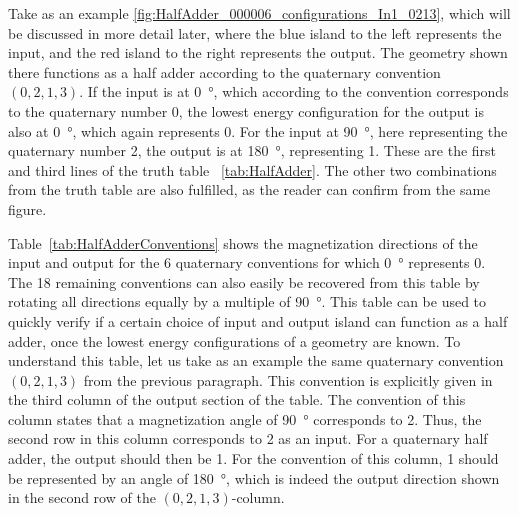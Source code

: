\documentclass[11pt,a4paper,english]{article}
\begin{document}
Take as an example \cref{fig:HalfAdder_000006_configurations_In1_0213}, which will be discussed in more detail later, where the blue island to the left represents the input, and the red island to the right represents the output. The geometry shown there functions as a half adder according to the quaternary convention $(0, 2, 1, 3)$. If the input is at \SI{0}{\degree}, which according to the convention corresponds to the quaternary number 0, the lowest energy configuration for the output is also at \SI{0}{\degree}, which again represents 0. For the input at \SI{90}{\degree}, here representing the quaternary number 2, the output is at \SI{180}{\degree}, representing 1. These are the first and third lines of the truth table~ \ref{tab:HalfAdder}. The other two combinations from the truth table are also fulfilled, as the reader can confirm from the same figure. \par
Table~\ref{tab:HalfAdderConventions} shows the magnetization directions of the input and output for the 6 quaternary conventions for which \SI{0}{\degree} represents 0. The 18 remaining conventions can also easily be recovered from this table by rotating all directions equally by a multiple of \SI{90}{\degree}. This table can be used to quickly verify if a certain choice of input and output island can function as a half adder, once the lowest energy configurations of a geometry are known. To understand this table, let us take as an example the same quaternary convention $(0, 2, 1, 3)$ from the previous paragraph. This convention is explicitly given in the third column of the output section of the table. The convention of this column states that a magnetization angle of \SI{90}{\degree} corresponds to 2. Thus, the second row in this column corresponds to 2 as an input. For a quaternary half adder, the output should then be 1. For the convention of this column, 1 should be represented by an angle of \SI{180}{\degree}, which is indeed the output direction shown in the second row of the $(0, 2, 1, 3)$-column.
 \par
\end{document}
